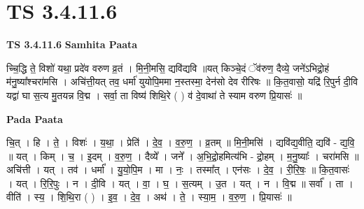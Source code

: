 \documentclass[17pt]{extarticle}
\begin{document}

\section{ TS 3.4.11.6 }

\textbf{TS 3.4.11.6 } \newline
\textbf{Samhita Paata} \newline

च्चि॒द्धि ते॒ विशो॑ यथा॒ प्रदे॑व वरुण व्र॒तं । मि॒नी॒मसि॒ द्यवि॑द्यवि ॥यत् किञ्चे॒दं ॅव॑रुण॒ दैव्ये॒ जने॑ऽभिद्रो॒हं म॑नु॒ष्या᳚श्चरा॑मसि । अचि॑त्ती॒यत् तव॒ धर्मा॑ युयोपि॒ममा न॒स्तस्मा॒ देन॑सो देव रीरिषः ॥ कि॒त॒वासो॒ यद्रि॑ रि॒पुर्न दी॒वि यद्वा॑ घा स॒त्य मु॒तयन्न वि॒द्म । सर्वा॒ ता विष्य॑ शिथि॒रे ( ) व॑ दे॒वाथा॑ ते स्याम वरुण प्रि॒यासः॑ ॥ \newline

\textbf{Pada Paata} \newline

चि॒त् । हि । ते॒ । विशः॑ । य॒था॒ । प्रेति॑ । दे॒व॒ । व॒रु॒ण॒ । व्र॒तम् ॥ मि॒नी॒मसि॑ । द्यवि॑द्य॒वीति॒ द्यवि॑ - द्य॒वि॒ ॥ यत् । किम् । च॒ । इ॒दम् । व॒रु॒ण॒ । दैव्ये᳚ । जने᳚ । अ॒भि॒द्रो॒हमित्य॑भि - द्रो॒हम् । म॒नु॒ष्याः᳚ । चरा॑मसि ॥ अचि॑त्ती । यत् । तव॑ । धर्मा᳚ । यु॒यो॒पि॒म । मा । नः॒ । तस्मा᳚त् । एन॑सः । दे॒व॒ । री॒रि॒षः॒ ॥ कि॒त॒वासः॑ । यत् । रि॒रि॒पुः । न । दी॒वि । यत् । वा॒ । घ॒ । स॒त्यम् । उ॒त । यत् । न । वि॒द्म ॥ सर्वा᳚ । ता । वीति॑ । स्य॒ । शि॒थि॒रा ( ) । इ॒व॒ । दे॒व॒ । अथ॑ । ते॒ । स्या॒म॒ । व॒रु॒ण॒ । प्रि॒यासः॑ ॥  \newline
\end{document}
